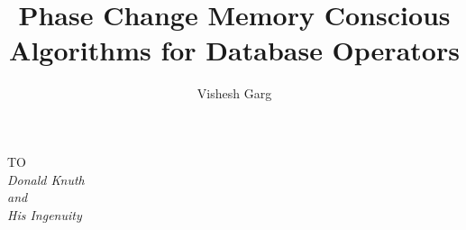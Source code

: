 
\pagestyle{bfheadings}



\begin{frontmatter}
%
%

\title{Phase Change Memory Conscious Algorithms for Database Operators\\ }

\author{Vishesh Garg}
\enggfaculty
\mscengg
\iisclogotrue %
\tablespagetrue %
\maketitle
\begin{dedication}
\begin{center}
TO \\[2em]
\large\it Donald Knuth\\
and\\
\large\it His Ingenuity 
\end{center}
\end{dedication}
\acknowledgements


\end{frontmatter}
